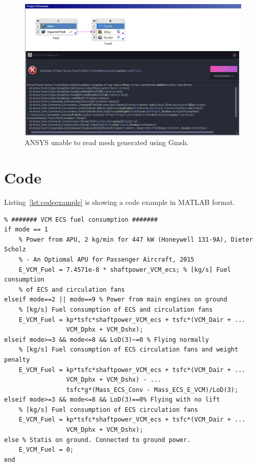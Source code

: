\documentclass[english]{kththesis}
\begin{document}
\begin{figure}[!htb]
    \centering
    \includegraphics[width=1\textwidth]{IPS/cant read gmsh mesh.png}
    \caption{ANSYS unable to read mesh generated using Gmsh.}
    \label{fig:ansys_error_gmsh}
\end{figure}


\clearpage
\section{Code}
\label{sec:AppMatlab}

Listing~\ref{lst:codeexample} is showing a code example in MATLAB format.

\begin{lstlisting}[caption={MATLAB Code for Fuel calculations.}, label=lst:codeexample]
% Testing to include MATLAB code in LaTeX
% ####### VCM ECS fuel consumption #######
if mode == 1
    % Power from APU, 2 kg/min for 447 kW (Honeywell 131-9A), Dieter Scholz
    % - An Optiomal APU for Passenger Aircraft, 2015
    E_VCM_Fuel = 7.4571e-8 * shaftpower_VCM_ecs; % [kg/s] Fuel consumption
    % of ECS and circulation fans
elseif mode==2 || mode==9 % Power from main engines on ground
    % [kg/s] Fuel consumption of ECS and circulation fans
    E_VCM_Fuel = kp*tsfc*shaftpower_VCM_ecs + tsfc*(VCM_Dair + ...
                 VCM_Dphx + VCM_Dshx); 
elseif mode>=3 && mode<=8 && LoD(3)~=0 % Flying normally
    % [kg/s] Fuel consumption of ECS circulation fans and weight penalty
    E_VCM_Fuel = kp*tsfc*shaftpower_VCM_ecs + tsfc*(VCM_Dair + ...
                 VCM_Dphx + VCM_Dshx) - ...
                 tsfc*g*(Mass_ECS_Conv - Mass_ECS_E_VCM)/LoD(3);
elseif mode>=3 && mode<=8 && LoD(3)==0% Flying with no lift
    % [kg/s] Fuel consumption of ECS circulation fans
    E_VCM_Fuel = kp*tsfc*shaftpower_VCM_ecs + tsfc*(VCM_Dair + ... 
                 VCM_Dphx + VCM_Dshx); 
else % Statis on ground. Connected to ground power.
    E_VCM_Fuel = 0;
end
\end{lstlisting}
\end{document}

